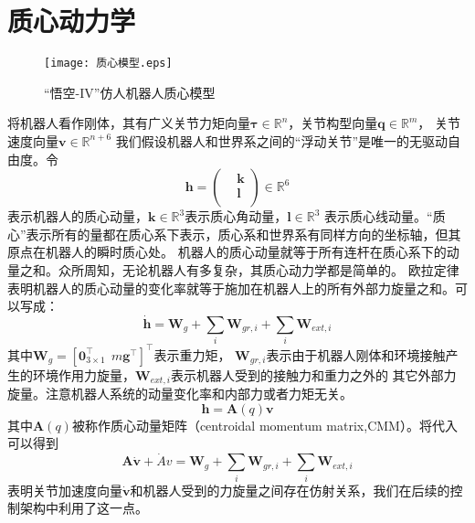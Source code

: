 \section{质心动力学}
\label{sec:dynamics}
\begin{figure}[htbp]
    \centering
    \texttt{[image: 质心模型.eps]}
    \caption{\label{fig:com_model}“悟空-IV”仿人机器人质心模型}
\end{figure}
将机器人看作刚体，其有广义关节力矩向量$\boldsymbol{\tau} \in {{\mathbb{R}}^{n}}$，关节构型向量$\boldsymbol{q}\in {{\mathbb{R}}^{m}}$，
关节速度向量$\boldsymbol{v}\in {{\mathbb{R}}^{n+6}}$
我们假设机器人和世界系之间的“浮动关节”是唯一的无驱动自由度。令
\begin{equation}
    \label{equ:momentum}
    \boldsymbol{h}=\left(\begin{aligned}
        & \boldsymbol{k} \\ 
       & \boldsymbol{l} \\ 
      \end{aligned} \right)\in \mathbb{R}^{6}
\end{equation}
表示机器人的质心动量，$\boldsymbol{k}\in {{\mathbb{R}}^{3}}$表示质心角动量，$\boldsymbol{l}\in {{\mathbb{R}}^{3}}$
表示质心线动量。“质心”表示所有的量都在质心系下表示，质心系和世界系有同样方向的坐标轴，但其原点在机器人的瞬时质心处。
机器人的质心动量就等于所有连杆在质心系下的动量之和。众所周知，无论机器人有多复杂，其质心动力学都是简单的。
欧拉定律表明机器人的质心动量的变化率就等于施加在机器人上的所有外部力旋量之和。可以写成：
\begin{equation}
    \label{equ:euler's_law}
    \dot{\boldsymbol{h}}={{\boldsymbol{W}}_{g}}+\sum\limits_{i}{{{\boldsymbol{W}}_{gr,i}}}+\sum\limits_{i}{{{\boldsymbol{W}}_{ext,i}}}
\end{equation}
其中${{\boldsymbol{W}}_{g}}={{[\mathbf{0}_{3\times 1}^{\top }\ \ m{{\mathbf{g}}^{\top }}]}^{\top }}$表示重力矩，
${\boldsymbol{W}}_{gr,i}$表示由于机器人刚体和环境接触产生的环境作用力旋量，${\boldsymbol{W}}_{ext,i}$表示机器人受到的接触力和重力之外的
其它外部力旋量。注意机器人系统的动量变化率和内部力或者力矩无关。
\begin{equation}
    \label{equ:euler_linear_equ}
    \boldsymbol{h}=\boldsymbol{A}(q)\boldsymbol{v}
\end{equation}
其中$\boldsymbol{A}(q)$被称作质心动量矩阵（centroidal momentum matrix,CMM）。将代入可以得到
\begin{equation}
    \label{equ:euler_wrench}
    \boldsymbol{A}\dot{\boldsymbol{v}}+\dot{A}v={{\boldsymbol{W}}_{g}}+\sum\limits_{i}{{{\boldsymbol{W}}_{gr,i}}}
    +\sum\limits_{i}{{{\boldsymbol{W}}_{ext,i}}}
\end{equation}
表明关节加速度向量$\dot{\boldsymbol{v}}$和机器人受到的力旋量之间存在仿射关系，我们在后续的控制架构中利用了这一点。

